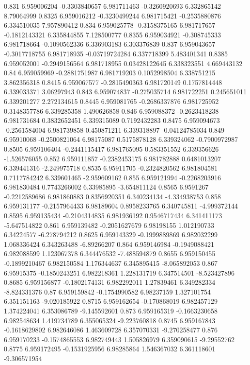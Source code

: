 {0.831 6.959006204 -0.3303840657 6.981711463 -0.3260920693 6.332865142 8.79064999
0.8325 6.959016212 -0.3230499244 6.981715421 -0.2535880876 6.334510035 7.957890412
0.834 6.959025778 -0.3158375165 6.981717657 -0.1812143321 6.335844855 7.128500777
0.8355 6.959034921 -0.308745333 6.981718664 -0.1090562336 6.336903183 6.303376839
0.837 6.959043657 -0.3017718755 6.981718935 -0.03719724284 6.337718399 5.483401341
0.8385 6.959052001 -0.2949156564 6.981718955 0.03428122645 6.338323551 4.669443132
0.84 6.959059969 -0.2881751987 6.981719203 0.1052998504 6.338751215 3.862356318
0.8415 6.959067577 -0.2815490363 6.981720149 0.1757814448 6.339033371 3.06297943
0.843 6.959074837 -0.275035714 6.981722251 0.245651011 6.339201277 2.272134615
0.8445 6.959081765 -0.2686337876 6.981725952 0.3148357786 6.339285358 1.490626858
0.846 6.959088372 -0.2623418238 6.981731684 0.3832652451 6.339315089 0.7192432283
0.8475 6.959094673 -0.2561584004 6.981739858 0.450871211 6.339318897 -0.04124785034
0.849 6.95910068 -0.2500821064 6.98175087 0.5175878128 6.339324062 -0.7900972987
0.8505 6.959106404 -0.2441115417 6.981765095 0.583351552 6.339356626 -1.526576055
0.852 6.959111857 -0.2382453175 6.981782888 0.6481013207 6.339441316 -2.249975718
0.8535 6.95911705 -0.2324820562 6.981804581 0.7117784242 6.339601465 -2.959609162
0.855 6.959121994 -0.2268203916 6.981830484 0.7743266002 6.33985895 -3.654811124
0.8565 6.9591267 -0.2212589686 6.981860883 0.8356920351 6.340234134 -4.334938753
0.858 6.959131177 -0.2157964433 6.98189604 0.8958233765 6.340745811 -4.999372144
0.8595 6.959135434 -0.2104314835 6.981936192 0.9546717434 6.341411173 -5.647514822
0.861 6.959139482 -0.2051627679 6.98198155 1.012190733 6.34224577 -6.278794212
0.8625 6.959143329 -0.1999889869 6.982032299 1.068336424 6.343263488 -6.89266207
0.864 6.959146984 -0.1949088421 6.982088599 1.123067378 6.344476532 -7.488594879
0.8655 6.959150455 -0.1899210467 6.982150584 1.176344637 6.345895415 -8.065892053
0.867 6.95915375 -0.1850243251 6.982218361 1.228131719 6.347514501 -8.523427896
0.8685 6.959156877 -0.1802174131 6.982292011 1.27839461 6.349282334 -8.824331376
0.87 6.959159842 -0.1754990582 6.98237159 1.327101754 6.351151163 -9.020185922
0.8715 6.959162654 -0.170868019 6.982457129 1.374224041 6.353086789 -9.145592601
0.873 6.959165319 -0.1663230658 6.982548634 1.419734789 6.355065324 -9.223760818
0.8745 6.959167843 -0.1618629802 6.982646086 1.463609728 6.357070331 -9.270258477
0.876 6.959170233 -0.1574865553 6.982749443 1.505826979 6.359090615 -9.29552762
0.8775 6.959172495 -0.1531925956 6.98285864 1.546367032 6.361118601 -9.306571954
}
